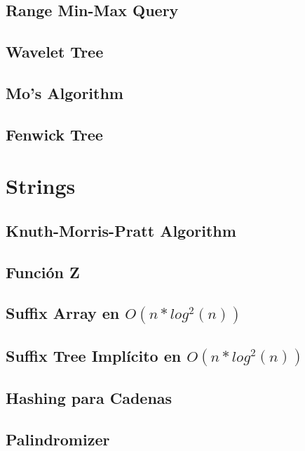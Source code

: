 \subsection{Range Min-Max Query}
\raggedbottom
\hrulefill
\subsection{Wavelet Tree}
\raggedbottom
\hrulefill
\subsection{Mo's Algorithm}
\raggedbottom
\hrulefill
\subsection{Fenwick Tree}
\raggedbottom
\hrulefill

\section{Strings}
\subsection{Knuth-Morris-Pratt Algorithm}
\raggedbottom
\hrulefill
\subsection{Funci\'on Z}
\raggedbottom
\hrulefill
\subsection{Suffix Array en $O(n * log^{2}(n))$}
\raggedbottom
\hrulefill
\subsection{Suffix Tree Impl\'icito en $O(n * log^{2}(n))$}
\raggedbottom
\hrulefill
\subsection{Hashing para Cadenas}
\raggedbottom
\hrulefill
\subsection{Palindromizer}
\raggedbottom
\hrulefill
